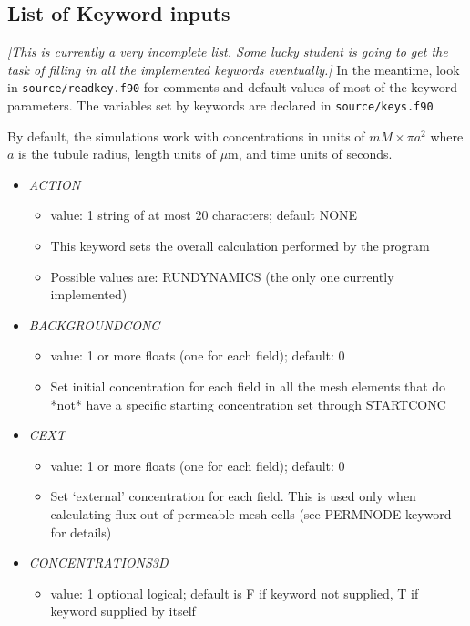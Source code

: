 \documentclass[12pt]{article}
\newcommand{\comment}[1]{{\color{red} \it [#1]}}
\begin{document}
\subsection*{List of Keyword inputs}

\comment{This is currently a very incomplete list. Some lucky student is going to get the task of filling in all the implemented keywords eventually.} In the meantime, look in \verb=source/readkey.f90= for comments and default values of most of the keyword parameters. The variables set by keywords are declared in \verb=source/keys.f90=

By default, the simulations work with concentrations in units of $mM \times \pi a^2$ where $a$ is the tubule radius, length units of $\mu$m, and time units of seconds.

\begin{itemize}
%
\item {\it ACTION}
  \begin{itemize}
    \item  value: 1 string of at most 20 characters; default NONE
    \item This keyword sets the overall calculation performed by the program 
    \item Possible values are: RUNDYNAMICS (the only one currently implemented)
  \end{itemize}
%
\item {\it BACKGROUNDCONC}
\begin{itemize}
	\item  value: 1 or more floats (one for each field); default: 0
	\item Set initial concentration for each field in all the mesh elements that do *not* have a specific starting concentration set through STARTCONC
\end{itemize}
%
\item {\it CEXT}
\begin{itemize}
	\item  value: 1 or more floats (one for each field); default: 0
	\item Set `external' concentration for each field. This is used only when calculating flux out of permeable mesh cells (see PERMNODE keyword for details)
\end{itemize}
%
\item {\it CONCENTRATIONS3D}
\begin{itemize}
	\item  value: 1 optional logical; default is F if keyword not supplied, T if keyword supplied by itself

\end{itemize}
\end{itemize}
\end{document}
